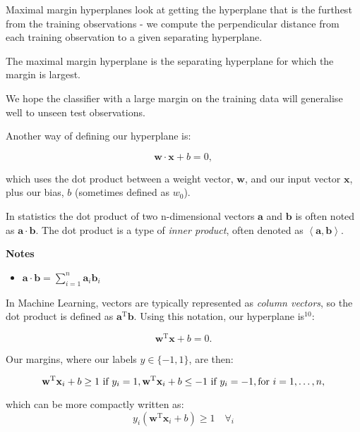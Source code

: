 \documentclass[11pt]{article}
\providecommand{\tightlist}{%
      \setlength{\itemsep}{0pt}\setlength{\parskip}{0pt}}
\begin{document}
Maximal margin hyperplanes look at getting the hyperplane that is the
furthest from the training observations - we compute the perpendicular
distance from each training observation to a given separating
hyperplane.

The maximal margin hyperplane is the separating hyperplane for which the
margin is largest.

We hope the classifier with a large margin on the training data will
generalise well to unseen test observations.

    Another way of defining our hyperplane is:

\[\mathbf{w} \cdot \mathbf{x} + b = 0,\]

which uses the dot product between a weight vector, \(\mathbf{w}\), and
our input vector \(\mathbf{x}\), plus our bias, \(b\) (sometimes defined
as \(w_0\)).

In statistics the dot product of two n-dimensional vectors
\(\mathbf{a}\) and \(\mathbf{b}\) is often noted as
\(\mathbf{a} \cdot \mathbf{b}\). The dot product is a type of
\emph{inner product}, often denoted as
\(\left<\mathbf{a},\mathbf{b}\right>\).

    \textbf{Notes}

\begin{itemize}
\tightlist
\item
  \(\mathbf{a} \cdot \mathbf{b} = \sum\limits^n_{i=1}\mathbf{a}_i\mathbf{b}_i\)
\end{itemize}

    In Machine Learning, vectors are typically represented as \emph{column
vectors}, so the dot product is defined as
\(\mathbf{a}^{\mathrm T} \mathbf{b}\). Using this notation, our
hyperplane is\(^{10}\):

\[\mathbf{w}^{\mathrm T}\mathbf{x} + b = 0.\]

Our margins, where our labels \(y \in \{-1,1\}\), are then:

\[
\mathbf{w}^{\mathrm T}\mathbf{x}_i + b \geq 1 \text{ if } y_i = 1, \\
\mathbf{w}^{\mathrm T}\mathbf{x}_i + b \leq -1 \text{ if } y_i = -1, \\
\text{for } i = 1,\ldots,n,
\]

which can be more compactly written as: \[
y_i\left(\mathbf{w}^{\mathrm T}\mathbf{x}_i + b\right) \geq 1 \quad \forall_i
\]

    \begin{center}
    \end{center}
    { \hspace*{\fill} \\}
    
\end{document}
